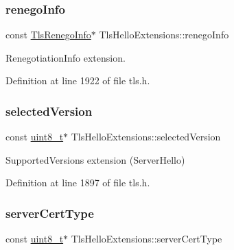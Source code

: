 \mbox{\label{structTlsHelloExtensions_aecf5a78a44bd06ba8018bd5f4a5043de}} 
\subsubsection{\texorpdfstring{renego\+Info}{renegoInfo}}
{\footnotesize\ttfamily const \hyperlink{tls_8h_a91a1f867efbc9e94610e512a667e3e16}{Tls\+Renego\+Info}$\ast$ Tls\+Hello\+Extensions\+::renego\+Info}



Renegotiation\+Info extension. 



Definition at line 1922 of file tls.\+h.

\mbox{\label{structTlsHelloExtensions_a3fcdd9177ae16d800a0c7de6a6a45786}} 
\subsubsection{\texorpdfstring{selected\+Version}{selectedVersion}}
{\footnotesize\ttfamily const \hyperlink{stdint_8h_aba7bc1797add20fe3efdf37ced1182c5}{uint8\+\_\+t}$\ast$ Tls\+Hello\+Extensions\+::selected\+Version}



Supported\+Versions extension (Server\+Hello) 



Definition at line 1897 of file tls.\+h.

\mbox{\label{structTlsHelloExtensions_a2a473c126ac51cf3dd2e999ee6881186}} 
\subsubsection{\texorpdfstring{server\+Cert\+Type}{serverCertType}}
{\footnotesize\ttfamily const \hyperlink{stdint_8h_aba7bc1797add20fe3efdf37ced1182c5}{uint8\+\_\+t}$\ast$ Tls\+Hello\+Extensions\+::server\+Cert\+Type}



